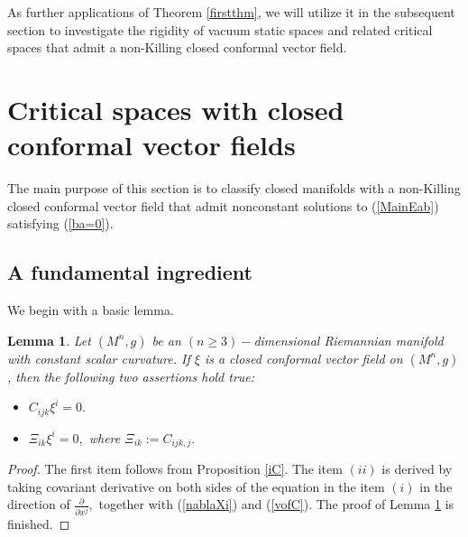 \documentclass[10pt,leqno,oneside]{amsart}
\newtheorem{Lem}{Lemma}
\begin{document}
{           As further applications of Theorem \ref{firstthm}, we will utilize it in the subsequent section to investigate the rigidity of vacuum static spaces and related critical spaces that admit a non-Killing closed conformal vector field.





\section{Critical spaces with closed conformal vector fields}
         The main purpose of this section is to classify closed manifolds with a non-Killing closed conformal vector field that admit nonconstant solutions to (\ref{MainEab}) satisfying (\ref{ba=0}).
    \subsection{A fundamental ingredient}
         We begin with a basic lemma.
    \begin{Lem}\label{CxiCxi}
       Let $(M^n, g)$ be an $(n\ge3)-$dimensional Riemannian manifold with constant scalar curvature. If $\xi$ is a closed conformal vector field on $(M^n, g)$, then the following two assertions hold true:
       \begin{itemize}[leftmargin=0.5cm, itemindent=0.4cm]
         \item[(i).] $C_{ijk}\xi^i=0.$
         \item[(ii).] $\Xi_{ik}\xi^i=0,$ where $\Xi_{ik}:=C_{ijk,j}.$
       \end{itemize}
    \end{Lem}
    \begin{proof}
        The first item follows from Proposition \ref{iC}. The item $(ii)$ is derived by taking covariant derivative on both sides of the equation in the item $(i)$ in the direction of $\frac{\partial}{\partial x^j},$ together with (\ref{nablaXi}) and (\ref{vofC}). The proof of Lemma \ref{CxiCxi} is finished.
    \end{proof}

}
\end{document}
